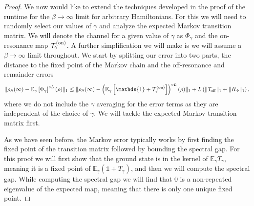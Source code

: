 \documentclass{article}
\newcommand{\on}{\rm on}
\newcommand{\off}{\rm off}
\newcommand{\norm}[1]{\| #1 \|}
\newcommand{\EE}{\mathbb{E}}
\newcommand{\identity}{\mathds{1}}
\begin{document}
\begin{proof}
    We now would like to extend the techniques developed in the proof of the runtime for the $\beta \to \infty$ limit for arbitrary Hamiltonians. For this we will need to randomly select our values of $\gamma$ and analyze the expected Markov transition matrix. We will denote the channel for a given value of $\gamma$ as $\Phi_{\gamma}$ and the on-resonance map $\mathcal{T}_{\gamma}^{(\on)}$. A further simplification we will make is we will assume a $\beta \to \infty$ limit throughout. We start by splitting our error into two parts, the distance to the fixed point of the Markov chain and the off-resonance and remainder errors
\begin{align}
    \norm{\rho_S(\infty) - \EE_\gamma \left[\Phi_{\gamma}\right]^{\circ L} (\rho)}_1 \le \norm{\rho_S(\infty) - \left(\EE_{\gamma}\left[  \identity + \mathcal{T}_\gamma^{(\on)}  \right] \right)^{\circ L}(\rho)}_1 + L \left(\norm{\mathcal{T}_{\off}}_1 + \norm{R_{\Phi}}_1\right),
\end{align}
where we do not include the $\gamma$ averaging for the error terms as they are independent of the choice of $\gamma$. We will tackle the expected Markov transition matrix first.

As we have seen before, the Markov error typically works by first finding the fixed point of the transition matrix followed by bounding the spectral gap. For this proof we will first show that the ground state is in the kernel of $\EE_\gamma T_\gamma$, meaning it is a fixed point of $\EE_\gamma (\identity + T_\gamma)$, and then we will compute the spectral gap. While computing the spectral gap we will find that 0 is a non-repeated eigenvalue of the expected map, meaning that there is only one unique fixed point. 


\end{proof}
\end{document}
